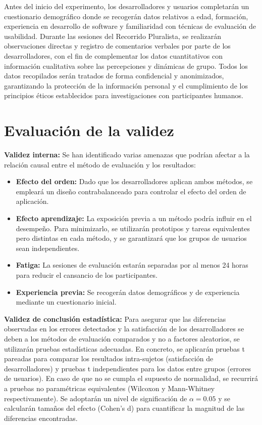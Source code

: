 \documentclass[a4paper,12pt]{report}
\begin{document}
Antes del inicio del experimento, los desarrolladores y usuarios completarán un cuestionario demográfico donde se recogerán datos relativos a edad, formación, experiencia en desarrollo de software y familiaridad con técnicas de evaluación de usabilidad. Durante las sesiones del Recorrido Pluralista, se realizarán observaciones directas y registro de comentarios verbales por parte de los desarrolladores, con el fin de complementar los datos cuantitativos con información cualitativa sobre las percepciones y dinámicas de grupo.
Todos los datos recopilados serán tratados de forma confidencial y anonimizados, garantizando la protección de la información personal y el cumplimiento de los principios éticos establecidos para investigaciones con participantes humanos.

\section{Evaluación de la validez}

\textbf{Validez interna:} Se han identificado varias amenazas que podrían afectar a la relación causal entre el método 
de evaluación y los resultados: 
\begin{itemize}
    \item \textbf{Efecto del orden:} Dado que los desarrolladores aplican ambos métodos, se empleará un diseño contrabalanceado para controlar el efecto del orden de aplicación.
    \item \textbf{Efecto aprendizaje:} La exposición previa a un método podría influir en el desempeño. Para minimizarlo, se utilizarán prototipos y tareas equivalentes pero distintas en cada método, y se garantizará que los grupos de usuarios sean independientes.
    \item \textbf{Fatiga:} La sesiones de evaluación estarán separadas por al menos 24 horas para reducir el cansancio de los participantes. 
    \item \textbf{Experiencia previa:} Se recogerán datos demográficos y de experiencia mediante un cuestionario inicial.
\end{itemize}

\textbf{Validez de conclusión estadística:} Para asegurar que las diferencias observadas en los errores detectados y la 
satisfacción de los desarrolladores se deben a los métodos de evaluación comparados y no a factores aleatorios, 
se utilizarán pruebas estadísticas adecuadas. En concreto, se aplicarán pruebas t pareadas para comparar los resultados intra-sujetos (satisfacción de 
desarrolladores) y pruebas t independientes para los datos entre grupos (errores de usuarios). En caso de que no se cumpla el 
supuesto de normalidad, se recurrirá a pruebas no paramétricas equivalentes (Wilcoxon y Mann-Whitney respectivamente).
Se adoptarán un nivel de significación de $\alpha=0.05$ y se calcularán tamaños del efecto (Cohen’s d) para cuantificar la magnitud de las diferencias encontradas.
\end{document}
